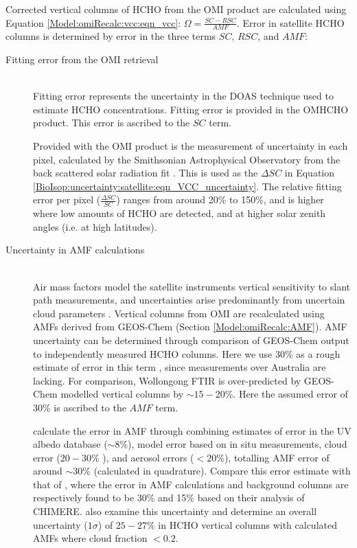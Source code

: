     Corrected vertical columns of HCHO from the OMI product are calculated using Equation \ref{Model:omiRecalc:vcc:eqn_vcc}:
    $\Omega = \frac{SC - RSC}{AMF}$.
    Error in satellite HCHO columns is determined by error in the three terms $SC$, $RSC$, and $AMF$:
    \begin{description}
      \item [Fitting error from the OMI retrieval] \hfill \\
        Fitting error represents the uncertainty in the DOAS technique used to estimate HCHO concentrations.
        Fitting error is provided in the OMHCHO product.
        This error is ascribed to the $SC$ term.
        
        Provided with the OMI product is the measurement of uncertainty in each pixel, calculated by the Smithsonian Astrophysical Observatory from the back scattered solar radiation fit \parencite{Abad2015,Abad2016}.
        This is used as the $\Delta SC$ in Equation \ref{BioIsop:uncertainty:satellite:eqn_VCC_uncertainty}.
        The relative fitting error per pixel ($\frac{\Delta SC}{SC}$) ranges from around 20\% to 150\%, and is higher where low amounts of HCHO are detected, and at higher solar zenith angles (i.e. at high latitudes).
      
      
      \item [Uncertainty in AMF calculations] \hfill \\
        Air mass factors model the satellite instruments vertical sensitivity to slant path measurements, and uncertainties arise predominantly from uncertain cloud parameters \parencite{Palmer2006}.
        Vertical columns from OMI are recalculated using AMFs derived from GEOS-Chem (Section \ref{Model:omiRecalc:AMF}).
        AMF uncertainty can be determined through comparison of GEOS-Chem output to independently measured HCHO columns.
        Here we use 30\% as a rough estimate of error in this term \parencite{Palmer2006}, since measurements over Australia are lacking.
        For comparison, Wollongong FTIR is over-predicted by GEOS-Chem modelled vertical columns by $\sim{15-20}\%$.
        Here the assumed error of 30\% is ascribed to the $AMF$ term.
        
        
        \textcite{Palmer2006} calculate the error in AMF through combining estimates of error in the UV albedo database ($\sim 8$\%), model error based on in situ measurements, cloud error  ($20-30$\% \parencite{Martin2003}), and aerosol errors ($<20$\%), totalling AMF error of around $\sim 30$\% (calculated in quadrature).
        Compare this error estimate with that of \textcite{Curci2010}, where the error in AMF calculations and background columns are respectively found to be 30\% and 15\% based on their analysis of CHIMERE.
        \textcite{Millet2008} also examine this uncertainty and determine an overall uncertainty ($1\sigma$) of $25-27\%$ in HCHO vertical columns with calculated AMFs where cloud fraction $< 0.2$.
        

\end{description}
